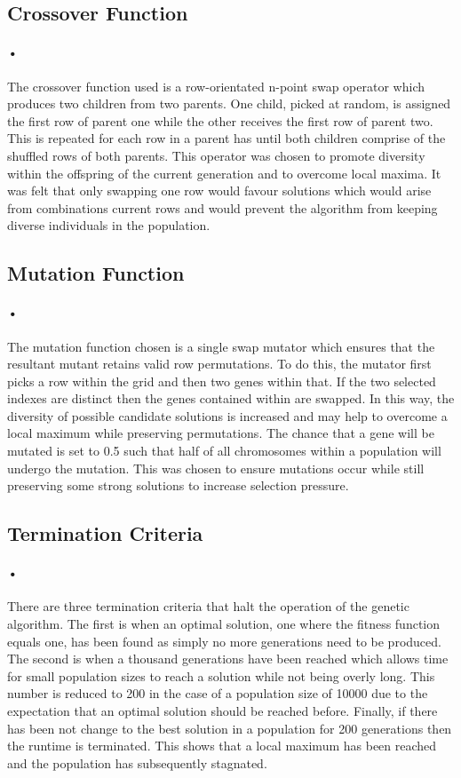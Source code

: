 \documentclass[10pt]{article}
\begin{document}
\subsection{Crossover Function}
\paragraph{•}
The crossover function used is a row-orientated n-point swap operator which produces two children from two parents. One child, picked at random, is assigned the first row of parent one while the other receives the first row of parent two. This is repeated for each row in a parent has until both children comprise of the shuffled rows of both parents. This operator was chosen to promote diversity within the offspring of the current generation and to overcome local maxima. It was felt that only swapping one row would favour solutions which would arise from combinations current rows and would prevent the algorithm from keeping diverse individuals in the population.
\subsection{Mutation Function}
\paragraph{•}
The mutation function chosen is a single swap mutator which ensures that the resultant mutant retains valid row permutations. To do this, the mutator first picks a row within the grid and then two genes within that. If the two selected indexes are distinct then the genes contained within are swapped. In this way, the diversity of possible candidate solutions is increased and may help to overcome a local maximum while preserving permutations. The chance that a gene will be mutated is set to 0.5 such that half of all chromosomes within a population will undergo the mutation. This was chosen to ensure mutations occur while still preserving some strong solutions to increase selection pressure.


\subsection{Termination Criteria}
\paragraph{•}
There are three termination criteria that halt the operation of the genetic algorithm. The first is when an optimal solution, one where the fitness function equals one, has been found as simply no more generations need to be produced. The second is when a thousand generations have been reached which allows time for small population sizes to reach a solution while not being overly long. This number is reduced to 200 in the case of a population size of 10000 due to the expectation that an optimal solution should be reached before. Finally, if there has been not change to the best solution in a population for 200 generations then the runtime is terminated. This shows that a local maximum has been reached and the population has subsequently stagnated.
\end{document}
